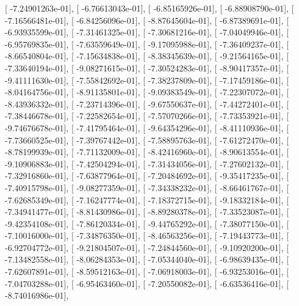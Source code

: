 \documentclass{article}
\begin{document}
       [ -7.24901263e-01],
       [ -6.76613043e-01],
       [ -6.85165926e-01],
       [ -6.88908790e-01],
       [ -7.16566481e-01],
       [ -6.84256096e-01],
       [ -8.87645604e-01],
       [ -6.87389691e-01],
       [ -6.93935599e-01],
       [ -7.31461325e-01],
       [ -7.30681216e-01],
       [ -7.04049946e-01],
       [ -6.95769835e-01],
       [ -7.63559649e-01],
       [ -9.17095988e-01],
       [ -7.36409237e-01],
       [ -8.66540804e-01],
       [ -7.15634838e-01],
       [ -8.38345639e-01],
       [ -9.21564165e-01],
       [ -7.33640194e-01],
       [ -9.08271615e-01],
       [ -7.30524283e-01],
       [ -8.90417357e-01],
       [ -9.41111630e-01],
       [ -7.55842692e-01],
       [ -7.38237809e-01],
       [ -7.17459186e-01],
       [ -8.04164756e-01],
       [ -8.91135801e-01],
       [ -9.09383549e-01],
       [ -7.22307072e-01],
       [ -8.43936332e-01],
       [ -7.23714396e-01],
       [ -9.67550637e-01],
       [ -7.44272401e-01],
       [ -7.38446678e-01],
       [ -7.22582654e-01],
       [ -7.57070266e-01],
       [ -7.73353921e-01],
       [ -9.74676678e-01],
       [ -7.41795464e-01],
       [ -9.64354296e-01],
       [ -8.41110936e-01],
       [ -7.73660525e-01],
       [ -7.39767442e-01],
       [ -7.58895763e-01],
       [ -7.61272470e-01],
       [ -8.78199939e-01],
       [ -7.71132009e-01],
       [ -8.42416960e-01],
       [ -8.90613554e-01],
       [ -9.10906883e-01],
       [ -7.42504294e-01],
       [ -7.31434056e-01],
       [ -7.27602132e-01],
       [ -7.32916860e-01],
       [ -7.63877964e-01],
       [ -7.20484692e-01],
       [ -9.35417235e-01],
       [ -7.40915798e-01],
       [ -9.08277359e-01],
       [ -7.34338232e-01],
       [ -8.66461767e-01],
       [ -7.62685349e-01],
       [ -7.16247774e-01],
       [ -7.18372715e-01],
       [ -9.18332184e-01],
       [ -7.34941477e-01],
       [ -8.81430986e-01],
       [ -8.89280378e-01],
       [ -7.33523087e-01],
       [ -9.42354108e-01],
       [ -7.86120334e-01],
       [ -9.44765292e-01],
       [ -7.38077150e-01],
       [ -7.10016000e-01],
       [ -7.34876350e-01],
       [ -8.46563256e-01],
       [ -7.19443773e-01],
       [ -6.92704772e-01],
       [ -9.21804507e-01],
       [ -7.24844560e-01],
       [ -9.10920200e-01],
       [ -7.13482558e-01],
       [ -8.06284353e-01],
       [ -7.05344040e-01],
       [ -6.98639435e-01],
       [ -7.62607891e-01],
       [ -8.59512163e-01],
       [ -7.06918003e-01],
       [ -6.93253016e-01],
       [ -7.04703288e-01],
       [ -6.95463460e-01],
       [ -7.20550082e-01],
       [ -6.63536416e-01],
       [ -8.74016986e-01],
\end{document}

